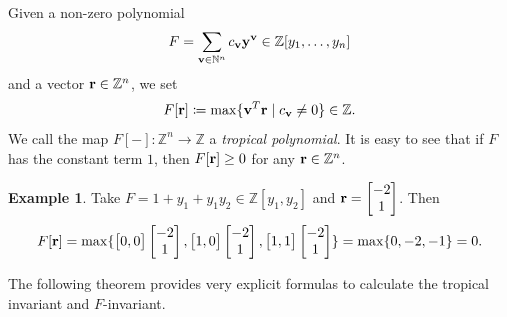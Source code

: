 \documentclass[12pt]{amsart}
\theoremstyle{definition}
\newtheorem{example}[theorem]{Example}
\theoremstyle{remark}
\numberwithin{equation}{section}
\begin{document}
 Given a non-zero polynomial $$F=\sum_{{\bf v}\in\mathbb N^n}c_{{\bf v}}{\bf y}^{{\bf v}}\in\mathbb Z[y_1,\ldots,y_n]$$ and a vector ${\bf r}\in \mathbb Z^n$, we set
$$F[{\bf r}] \coloneqq   \max\{{\bf v}^T{\bf r}\mid c_{{\bf v}}\neq 0\}\in\mathbb Z.$$
We call the map $F[-]\colon \mathbb Z^n\rightarrow\mathbb Z$ a {\em tropical polynomial}. It is easy to see that if $F$ has the constant term $1$, then $F[{\bf r}]\geq 0$ for any ${\bf r}\in\mathbb Z^n$.



\begin{example}
 Take $F=1+y_1+y_1y_2\in\mathbb Z[y_1,y_2]$ and ${\bf r}=\begin{bmatrix}
     -2\\1
 \end{bmatrix}$. Then
 \begin{eqnarray}
     F[{\bf r}]=\max\{
     \begin{bmatrix}
         0,0
     \end{bmatrix}\begin{bmatrix}
     -2\\1
 \end{bmatrix}, \begin{bmatrix}
         1,0
     \end{bmatrix}\begin{bmatrix}
     -2\\1
 \end{bmatrix}, \begin{bmatrix}
         1,1
     \end{bmatrix}\begin{bmatrix}
     -2\\1
 \end{bmatrix}
     \}=\max\{0,-2,-1\}=0.
     \nonumber
 \end{eqnarray}
\end{example}

The following theorem provides very explicit formulas to  calculate the tropical invariant and $F$-invariant.
\end{document}
